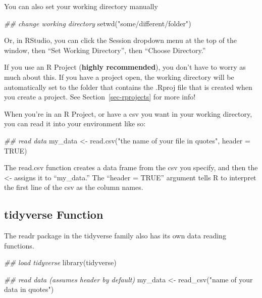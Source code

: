 \documentclass[
  letterpaper,
  DIV=11,
  numbers=noendperiod]{scrreprt}
\newenvironment{Shaded}{\begin{snugshade}}{\end{snugshade}}
\newcommand{\AttributeTok}[1]{\textcolor[rgb]{0.40,0.45,0.13}{#1}}
\newcommand{\ConstantTok}[1]{\textcolor[rgb]{0.56,0.35,0.01}{#1}}
\newcommand{\DocumentationTok}[1]{\textcolor[rgb]{0.37,0.37,0.37}{\textit{#1}}}
\newcommand{\FunctionTok}[1]{\textcolor[rgb]{0.28,0.35,0.67}{#1}}
\newcommand{\NormalTok}[1]{\textcolor[rgb]{0.00,0.23,0.31}{#1}}
\newcommand{\OtherTok}[1]{\textcolor[rgb]{0.00,0.23,0.31}{#1}}
\newcommand{\StringTok}[1]{\textcolor[rgb]{0.13,0.47,0.30}{#1}}
\begin{document}
You can also set your working directory manually

\begin{Shaded}
\begin{Highlighting}[]
\DocumentationTok{\#\# change working directory}
\FunctionTok{setwd}\NormalTok{(}\StringTok{"some/different/folder"}\NormalTok{)}
\end{Highlighting}
\end{Shaded}

Or, in RStudio, you can click the Session dropdown menu at the top of
the window, then ``Set Working Directory'', then ``Choose Directory.''

If you use an R Project (\textbf{highly recommended}), you don't have to
worry as much about this. If you have a project open, the working
directory will be automatically set to the folder that contains the
.Rproj file that is created when you create a project. See
Section~\ref{sec-rprojects} for more info!

When you're in an R Project, or have a csv you want in your working
directory, you can read it into your environment like so:

\begin{Shaded}
\begin{Highlighting}[]
\DocumentationTok{\#\# read data}
\NormalTok{my\_data }\OtherTok{\textless{}{-}} \FunctionTok{read.csv}\NormalTok{(}\StringTok{"the name of your file in quotes"}\NormalTok{, }\AttributeTok{header =} \ConstantTok{TRUE}\NormalTok{)}
\end{Highlighting}
\end{Shaded}

The read.csv function creates a data frame from the csv you specify, and
then the \textless- assigns it to ``my\_data.'' The ``header = TRUE''
argument tells R to interpret the first line of the csv as the column
names.

\hypertarget{tidyverse-function}{%
\subsection{tidyverse Function}\label{tidyverse-function}}

The readr package in the tidyverse family also has its own data reading
functions.

\begin{Shaded}
\begin{Highlighting}[]
\DocumentationTok{\#\# load tidyverse}
\FunctionTok{library}\NormalTok{(tidyverse)}

\DocumentationTok{\#\# read data (assumes header by default)}
\NormalTok{my\_data }\OtherTok{\textless{}{-}} \FunctionTok{read\_csv}\NormalTok{(}\StringTok{"name of your data in quotes"}\NormalTok{)}
\end{Highlighting}
\end{Shaded}
\end{document}
